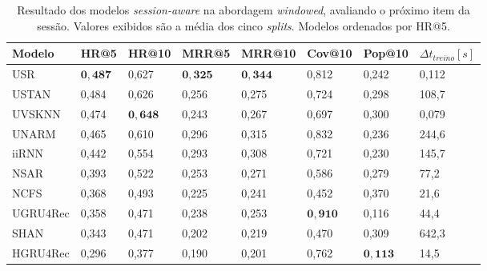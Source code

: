 \begin{table}[htbp]
  \begin{tabular}{|l|l|l|l|l|l|l|l|}
    \hline
    Modelo & HR@5 & HR@10 & MRR@5 & MRR@10 & Cov@10 & Pop@10 & $\Delta t_{treino} [s]$ \\
    \hline
    USR & $\mathbf{0{,}487}$ & 0,627 & $\mathbf{0{,}325}$ & $\mathbf{0{,}344}$ & 0,812 & 0,242 & 0,112 \\
    \hline
    USTAN & 0,484 & 0,626 & 0,256 & 0,275 & 0,724 & 0,298 & 108,7 \\
    \hline
    UVSKNN & 0,474 & $\mathbf{0{,}648}$ & 0,243 & 0,267 & 0,697 & 0,300 & 0,079 \\
    \hline
    UNARM & 0,465 & 0,610 & 0,296 & 0,315 & 0,832 & 0,236 & 244,6 \\
    \hline
    iiRNN & 0,442 & 0,554 & 0,293 & 0,308 & 0,721 & 0,230 & 145,7 \\
    \hline
    NSAR & 0,393 & 0,522 & 0,253 & 0,271 & 0,586 & 0,279 & 77,2 \\
    \hline
    NCFS & 0,368 & 0,493 & 0,225 & 0,241 & 0,452 & 0,370 & 21,6 \\
    \hline
    UGRU4Rec & 0,358 & 0,471 & 0,238 & 0,253 & $\mathbf{0,910}$ & 0,116 & 44,4 \\
    \hline
    SHAN & 0,343 & 0,471 & 0,202 & 0,219 & 0,470 & 0,309 & 642,3 \\
    \hline
    HGRU4Rec & 0,296 & 0,377 & 0,190 & 0,201 & 0,762 & $\mathbf{0,113}$ & 14,5 \\
    \hline
    \end{tabular}
  \caption{Resultado dos modelos \textit{session-aware} na abordagem
  \textit{windowed}, avaliando o próximo item da sessão. Valores exibidos são a
  média dos cinco \textit{splits}. Modelos ordenados por HR@5. }
\end{table}
\newpage
 
